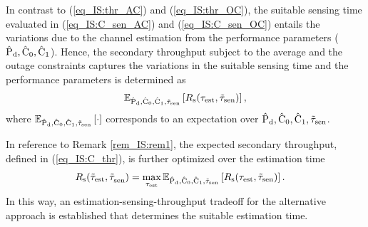 \begin{coro} \label{cor_IS:cor1}
\normalfont
{} 
In contrast to (\ref{eq_IS:thr_AC}) and (\ref{eq_IS:thr_OC}), the suitable sensing time evaluated in (\ref{eq_IS:C_sen_AC}) and (\ref{eq_IS:C_sen_OC}) entails the variations due to the channel estimation from the performance parameters ($\epd, \ecz, \eco$). Hence, the secondary throughput subject to the average and the outage constraints captures the variations in the suitable sensing time and the performance parameters is determined as 
\begin{align}
\e{\epd, \ecz, \eco, \ttsen}{\rs(\test, \ttsen)} \label{eq_IS:C_thr},
\end{align}
where $\e{\epd, \ecz, \eco, \ttsen}{\cdot}$ corresponds to an expectation over $\epd, \ecz, \eco, \ttsen$.

In reference to Remark \ref{rem_IS:rem1}, the expected secondary throughput, defined in (\ref{eq_IS:C_thr}), is further optimized over the estimation time 
\begin{align}
\trs(\ttest, \ttsenac) &= \maxi_{\test} \e{\epd, \ecz, \eco, \ttsen}{\rs(\test, \ttsen)} \label{eq_IS:C_thr_AC}. 
\end{align}
In this way, an estimation-sensing-throughput tradeoff for the alternative approach is established that determines the suitable estimation time.    
\end{coro}
